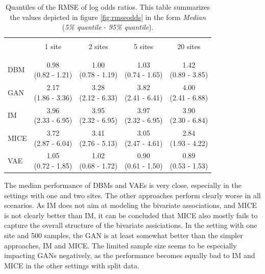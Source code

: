 \documentclass[12pt]{article}
\begin{document}
\begin{table}[ht]
\centering
\caption{Quantiles of the RMSE of log odds ratios. This table summarizes the values depicted in figure \ref{fig:rmseodds} in the form  {\em Median} ({\em 5\% quantile} - {\em 95\% quantile}).}
\label{tab:distgenresults_rmse}
\begin{tabular}{l|cccc}
\\\\[-4\medskipamount]
& 1 site & 2 sites & 5 sites & 20 sites \\[0.5ex]
\hline
\\\\[-4\medskipamount]
DBM & \makecell{0.98 \\ (0.82 - 1.21)} & \makecell{1.00 \\ (0.78 - 1.19)} & \makecell{1.03 \\ (0.74 - 1.65)} & \makecell{1.42 \\ (0.89 - 3.85)} \\[2ex]
GAN & \makecell{2.17 \\ (1.86 - 3.36)} & \makecell{3.28 \\ (2.12 - 6.33)} & \makecell{3.82 \\ (2.41 - 6.41)} & \makecell{4.00 \\ (2.41 - 6.88)} \\[2ex]
IM & \makecell{3.96 \\ (2.33 - 6.95)} & \makecell{3.95 \\ (2.32 - 6.95)} & \makecell{3.97 \\ (2.32 - 6.95)} & \makecell{3.90 \\ (2.30 - 6.84)} \\[2ex]
MICE & \makecell{3.72 \\ (2.87 - 6.04)} & \makecell{3.41 \\ (2.76 - 5.13)} & \makecell{3.05 \\ (2.47 - 4.61)} & \makecell{2.84 \\ (1.93 - 4.22)} \\[2ex]
VAE & \makecell{1.05 \\ (0.72 - 1.85)} & \makecell{1.02 \\ (0.68 - 1.72)} & \makecell{0.90 \\ (0.61 - 1.50)} & \makecell{0.89 \\ (0.53 - 1.53)} \\[2ex]
\end{tabular}
\end{table}

The median performance of DBMs and VAEs is very close, especially in the settings with one and two sites.
The other approaches perform clearly worse in all scenarios.
As IM does not aim at modeling the bivariate associations, and MICE is not clearly better than IM, it can be concluded that MICE also mostly fails to capture the overall structure of the bivariate assiciations.
In the setting with one site and 500 samples, the GAN is at least somewhat better than the simpler approaches, IM and MICE.
The limited sample size seems to be especially impacting GANs negatively, as the performance becomes equally bad to IM and MICE in the other settings with split data.
\end{document}
